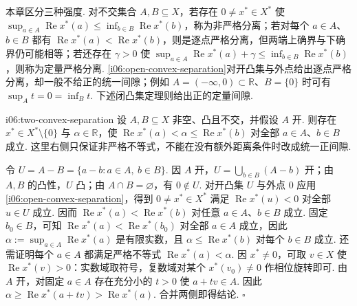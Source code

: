 \begin{FARemark}[分离结论的层级]
本章区分三种强度. 对不交集合 \(\displaystyle A,B\subseteq X\)，若存在 \(\displaystyle 0\neq x^*\in X^*\) 使 \(\displaystyle \sup_{a\in A}\operatorname{Re}x^*(a)\leqslant\inf_{b\in B}\operatorname{Re}x^*(b)\)，称为非严格分离；若对每个 \(\displaystyle a\in A\)、\(\displaystyle b\in B\) 都有 \(\displaystyle \operatorname{Re}x^*(a)<\operatorname{Re}x^*(b)\)，则是逐点严格分离，但两端上确界与下确界仍可能相等；若还存在 \(\displaystyle \gamma>0\) 使 \(\displaystyle \sup_{a\in A}\operatorname{Re}x^*(a)+\gamma\leqslant\inf_{b\in B}\operatorname{Re}x^*(b)\)，则称为定量严格分离. \autoref{i06:open-convex-separation}对开凸集与外点给出逐点严格分离，却一般不给正的统一间隙；例如 \(\displaystyle A=(-\infty,0)\subset\mathbb R\)、\(\displaystyle B=\{0\}\) 时可有 \(\displaystyle \sup_A t=0=\inf_B t\). 下述闭凸集定理则给出正的定量间隙.
\end{FARemark}

\begin{FAProposition}[C][两个凸集的一侧严格分离]{i06:two-convex-separation}
设 \(\displaystyle A,B\subseteq X\) 非空、凸且不交，并假设 \(\displaystyle A\) 开. 则存在 \(\displaystyle x^*\in X^*\setminus\{0\}\) 与 \(\displaystyle \alpha\in\mathbb R\)，使 \(\displaystyle \operatorname{Re}x^*(a)<\alpha\leqslant\operatorname{Re}x^*(b)\)
对全部 \(\displaystyle a\in A\)、\(\displaystyle b\in B\) 成立. 这里右侧只保证非严格不等式，不能在没有额外距离条件时改成统一正间隙.
\end{FAProposition}

\begin{FAProof}
令 \(\displaystyle U=A-B=\{a-b:a\in A,\ b\in B\}\). 因 \(\displaystyle A\) 开，\(\displaystyle U=\bigcup_{b\in B}(A-b)\) 开；由 \(\displaystyle A,B\) 的凸性，\(\displaystyle U\) 凸；由 \(\displaystyle A\cap B=\varnothing\)，有 \(\displaystyle0\notin U\). 对开凸集 \(\displaystyle U\) 与外点 \(\displaystyle0\) 应用\autoref{i06:open-convex-separation}，得到 \(\displaystyle0\neq x^*\in X^*\) 满足 \(\displaystyle \operatorname{Re}x^*(u)<0\) 对全部 \(\displaystyle u\in U\) 成立. 因而 \(\displaystyle \operatorname{Re}x^*(a)<\operatorname{Re}x^*(b)\)
对任意 \(\displaystyle a\in A\)、\(\displaystyle b\in B\) 成立. 固定 \(\displaystyle b_0\in B\)，可知 \(\displaystyle \operatorname{Re}x^*(a)<\operatorname{Re}x^*(b_0)\) 对全部 \(\displaystyle a\in A\) 成立，因此 \(\displaystyle \alpha:=\sup_{a\in A}\operatorname{Re}x^*(a)\)
是有限实数，且 \(\displaystyle \alpha\leqslant\operatorname{Re}x^*(b)\) 对每个 \(\displaystyle b\in B\) 成立. 还需证明每个 \(\displaystyle a\in A\) 都满足严格不等式 \(\displaystyle \operatorname{Re}x^*(a)<\alpha\). 因 \(\displaystyle x^*\neq0\)，可取 \(\displaystyle v\in X\) 使 \(\displaystyle \operatorname{Re}x^*(v)>0\)：实数域取符号，复数域对某个 \(\displaystyle x^*(v_0)\neq0\) 作相位旋转即可. 由 \(\displaystyle A\) 开，对固定 \(\displaystyle a\in A\) 存在充分小的 \(\displaystyle t>0\) 使 \(\displaystyle a+tv\in A\). 因此 \(\displaystyle \alpha\geqslant\operatorname{Re}x^*(a+tv)>\operatorname{Re}x^*(a)\). 合并两侧即得结论.
\hfill\(\square\)
\end{FAProof}

